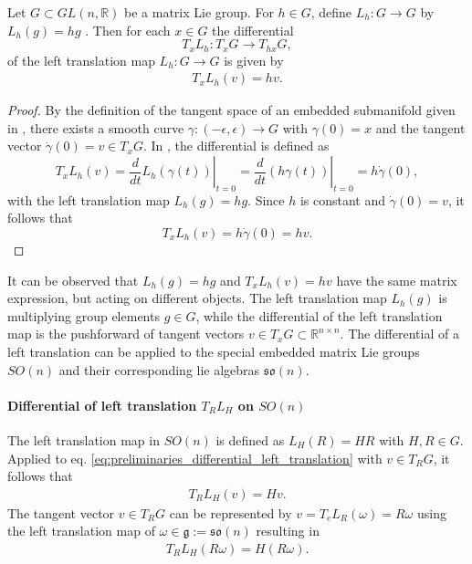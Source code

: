 \begin{proposition}
Let $G\subset GL(n,\mathbb{R})$ be a matrix Lie group.
For $h\in G$, define $L_h:G\to G$ by $L_h(g)=hg$ \cite{Hall2000LieGroups}.
Then for each $x\in G$ the differential
\[
T_xL_h: T_xG \to T_{hx}G,
\]
of the left translation map $L_h:G\to G$ is given by
\begin{align}\label{eq:preliminaries_differential_left_translation}
T_xL_h(v)=hv.
\end{align}
\end{proposition}
\begin{proof}
By the definition of the tangent space of an embedded submanifold given in \cite{Hall2000LieGroups}, there exists a smooth curve $\gamma: (-\epsilon,\epsilon) \to G$ with $\gamma(0)=x$ and the tangent vector $\dot{\gamma}(0)=v \in T_{x}G$.
In \cite{Lee2012ISM}, the differential is defined as
\[
T_xL_h(v)=\left.\frac{d}{dt}L_h(\gamma(t))\right|_{t=0}
=\left.\frac{d}{dt}(h\gamma(t))\right|_{t=0}=h\dot{\gamma}(0),
\]
with the left translation map $L_h(g)=hg$. Since $h$ is constant and $\dot{\gamma}(0)=v$, it follows that
\[
T_xL_h(v)=h\dot{\gamma}(0)=hv.
\]
\end{proof}

It can be observed that $L_{h}(g)=hg$ and $T_xL_{h}(v)=hv$ have the same matrix expression, but acting on different objects. The left translation map $L_{h}(g)$ is multiplying group elements $g \in G$, while the differential of the left translation map is the pushforward of tangent vectors $v \in T_{x}G \subset \mathbb{R}^{n \times n}$. The differential of a left translation can be applied to the special embedded matrix Lie groups $SO(n)$ and their corresponding lie algebras $\mathfrak{so}(n)$. 

\paragraph{Differential of left translation $T_RL_H$ on $SO(n)$}

The left translation map in $SO(n)$ is defined as $L_{H}(R) = HR$ with $H,R \in G$. Applied to eq. \eqref{eq:preliminaries_differential_left_translation} with $v \in T_{R}G$, it follows that 
\begin{align*}
    T_{R}L_{H}(v)= Hv.
\end{align*}
The tangent vector $v \in T_RG$ can be represented by $v = T_{e}L_{R}(\omega) = R\omega$ using the left translation map of $\omega \in \mathfrak g := \mathfrak{so}(n)$ resulting in 
\begin{align}\label{eq:preliminaries_differential_left_SO}
    T_RL_H(R \omega) = H(R \omega).
\end{align}

